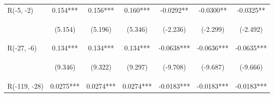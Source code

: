 \documentclass[]{article}
\begin{document}
\begin{center}
\begin{tabular}{lcccccc}
        R(-5, -2)        & 0.154***                                       & 0.156***                                       & 0.160***                                       & -0.0292**                                      & -0.0300**                                      & -0.0325**                                      \\
        \vspace{4pt}     & \begin{footnotesize}(5.154)\end{footnotesize}  & \begin{footnotesize}(5.196)\end{footnotesize}  & \begin{footnotesize}(5.346)\end{footnotesize}  & \begin{footnotesize}(-2.236)\end{footnotesize} & \begin{footnotesize}(-2.299)\end{footnotesize} & \begin{footnotesize}(-2.492)\end{footnotesize} \\
        R(-27, -6)       & 0.134***                                       & 0.134***                                       & 0.134***                                       & -0.0638***                                     & -0.0636***                                     & -0.0635***                                     \\
        \vspace{4pt}     & \begin{footnotesize}(9.346)\end{footnotesize}  & \begin{footnotesize}(9.322)\end{footnotesize}  & \begin{footnotesize}(9.297)\end{footnotesize}  & \begin{footnotesize}(-9.708)\end{footnotesize} & \begin{footnotesize}(-9.687)\end{footnotesize} & \begin{footnotesize}(-9.666)\end{footnotesize} \\
        R(-119, -28)     & 0.0275***                                      & 0.0274***                                      & 0.0274***                                      & -0.0183***                                     & -0.0183***                                     & -0.0183***                                     \\

\end{tabular}
\end{center}
\end{document}
